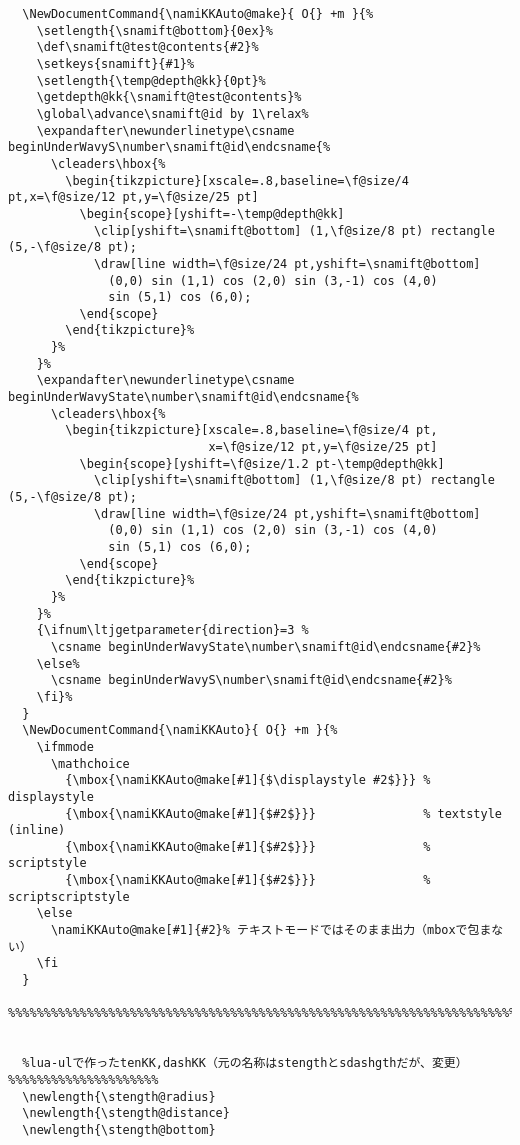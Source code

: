 \documentclass[luatex,fontsize=8pt,paper=b5,twoside]{jlreq}%
\begin{document}
\begin{lstlisting}
  \NewDocumentCommand{\namiKKAuto@make}{ O{} +m }{%
    \setlength{\snamift@bottom}{0ex}%
    \def\snamift@test@contents{#2}%
    \setkeys{snamift}{#1}%
    \setlength{\temp@depth@kk}{0pt}%
    \getdepth@kk{\snamift@test@contents}%
    \global\advance\snamift@id by 1\relax%
    \expandafter\newunderlinetype\csname beginUnderWavyS\number\snamift@id\endcsname{%
      \cleaders\hbox{%
        \begin{tikzpicture}[xscale=.8,baseline=\f@size/4 pt,x=\f@size/12 pt,y=\f@size/25 pt]
          \begin{scope}[yshift=-\temp@depth@kk]
            \clip[yshift=\snamift@bottom] (1,\f@size/8 pt) rectangle (5,-\f@size/8 pt);
            \draw[line width=\f@size/24 pt,yshift=\snamift@bottom]
              (0,0) sin (1,1) cos (2,0) sin (3,-1) cos (4,0)
              sin (5,1) cos (6,0);
          \end{scope}
        \end{tikzpicture}%
      }%
    }%
    \expandafter\newunderlinetype\csname beginUnderWavyState\number\snamift@id\endcsname{%
      \cleaders\hbox{%
        \begin{tikzpicture}[xscale=.8,baseline=\f@size/4 pt,
                            x=\f@size/12 pt,y=\f@size/25 pt]
          \begin{scope}[yshift=\f@size/1.2 pt-\temp@depth@kk]
            \clip[yshift=\snamift@bottom] (1,\f@size/8 pt) rectangle (5,-\f@size/8 pt);
            \draw[line width=\f@size/24 pt,yshift=\snamift@bottom]
              (0,0) sin (1,1) cos (2,0) sin (3,-1) cos (4,0)
              sin (5,1) cos (6,0);
          \end{scope}
        \end{tikzpicture}%
      }%
    }%
    {\ifnum\ltjgetparameter{direction}=3 %
      \csname beginUnderWavyState\number\snamift@id\endcsname{#2}%
    \else%
      \csname beginUnderWavyS\number\snamift@id\endcsname{#2}%
    \fi}%
  }
  \NewDocumentCommand{\namiKKAuto}{ O{} +m }{%
    \ifmmode
      \mathchoice
        {\mbox{\namiKKAuto@make[#1]{$\displaystyle #2$}}} % displaystyle
        {\mbox{\namiKKAuto@make[#1]{$#2$}}}               % textstyle (inline)
        {\mbox{\namiKKAuto@make[#1]{$#2$}}}               % scriptstyle
        {\mbox{\namiKKAuto@make[#1]{$#2$}}}               % scriptscriptstyle
    \else
      \namiKKAuto@make[#1]{#2}% テキストモードではそのまま出力（mboxで包まない）
    \fi
  }
  %%%%%%%%%%%%%%%%%%%%%%%%%%%%%%%%%%%%%%%%%%%%%%%%%%%%%%%%%%%%%%%%%%%%%%%%%%%%%%%%%%%%%%%%%


  %lua-ulで作ったtenKK,dashKK（元の名称はstengthとsdashgthだが、変更）%%%%%%%%%%%%%%%%%%%%%
  \newlength{\stength@radius}
  \newlength{\stength@distance}
  \newlength{\stength@bottom}


\end{lstlisting}
\end{document}

